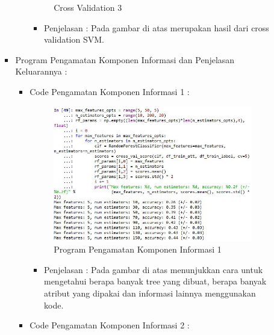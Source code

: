 \begin{enumerate}
\begin{itemize}
\begin{itemize}
\begin{itemize}
\begin{figure}[ht]
\caption{Cross Validation 3}
\label{contoh}
\end{figure}
\par
\begin{itemize}
\item Penjelasan : Pada gambar di atas merupakan hasil dari cross validation SVM.
\par
\par
\end{itemize}
\end{itemize}



\par
\par
\item Program Pengamatan Komponen Informasi dan Penjelasan Keluarannya :
\begin{itemize}
\item Code Pengamatan Komponen Informasi 1 :
\par
\begin{figure}[ht]
\centering
\includegraphics[scale=0.7]{figures/cod29.jpg}
\caption{Program Pengamatan Komponen Informasi 1}
\label{contoh}
\end{figure}
\par
\begin{itemize}
\item Penjelasan : Pada gambar di atas menunjukkan cara untuk mengetahui berapa banyak tree yang dibuat, berapa banyak atribut yang dipakai dan informasi lainnya menggunakan kode.
\par 
\par
\end{itemize}
\item Code Pengamatan Komponen Informasi 2 :

\end{itemize}
\end{itemize}
\end{itemize}
\end{enumerate}

